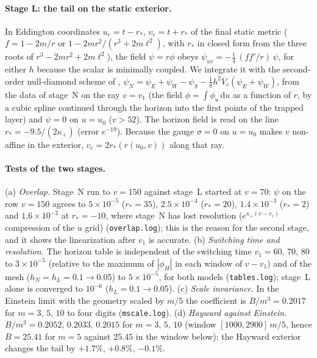 \documentclass[11pt]{article}
\begin{document}
\paragraph{Stage L: the tail on the static exterior.} In Eddington coordinates $u_e=t-r_*$, $v_e=t+r_*$ of the final static metric ($f=1-2m/r$ or $1-2mr^{2}/(r^{3}+2m\ell^{2})$, with $r_*$ in closed form from the three roots of $r^{3}-2mr^{2}+2m\ell^{2}$), the field $\psi=r\phi$ obeys $\psi_{uv}=-\tfrac14\,(ff'/r)\,\psi$, for either $h$ because the scalar is minimally coupled. We integrate it with the second-order null-diamond scheme of \citet{GundlachPricePullin1994}, $\psi_N=\psi_E+\psi_W-\psi_S-\tfrac18h^{2}V_c(\psi_E+\psi_W)$, from the data of stage~N on the ray $v=v_1$ (the field $\phi=\int\phi_u\,\mathrm du$ as a function of $r$, by a cubic spline continued through the horizon into the first points of the trapped layer) and $\psi=0$ on $u=u_0$ ($v>52$). The horizon field is read on the line $r_*=-9.5/(2\kappa_+)$ (error $e^{-19}$). Because the gauge $\sigma=0$ on $u=u_0$ makes $v$ non-affine in the exterior, $v_e=2r_*(r(u_0,v))$ along that ray.

\paragraph{Tests of the two stages.} (a) \emph{Overlap.} Stage~N run to $v=150$ against stage~L started at $v=70$: $\psi$ on the row $v=150$ agrees to $5\times10^{-5}$ ($r_*=35$), $2.5\times10^{-4}$ ($r_*=20$), $1.4\times10^{-3}$ ($r_*=2$) and $1.6\times10^{-2}$ at $r_*=-10$, where stage~N has lost resolution ($e^{\kappa_+(v-v_c)}$ compression of the $u$ grid) (\texttt{overlap.log}); this is the reason for the second stage, and it shows the linearization after $v_1$ is accurate. (b) \emph{Switching time and resolution.} The horizon table is independent of the switching time $v_1=60,\,70,\,80$ to $3\times10^{-5}$ (relative to the maximum of $|\phi_H|$ in each window of $v-v_1$) and of the mesh ($h_N=h_L=0.1\to0.05$) to $5\times10^{-5}$, for both models (\texttt{tables.log}); stage~L alone is converged to $10^{-6}$ ($h_L=0.1\to0.05$). (c) \emph{Scale invariance.} In the Einstein limit with the geometry scaled by $m/5$ the coefficient is $B/m^{3}=0.2017$ for $m=3,\,5,\,10$ to four digits (\texttt{mscale.log}). (d) \emph{Hayward against Einstein.} $B/m^{3}=0.2052,\,0.2033,\,0.2015$ for $m=3,\,5,\,10$ (window $[1000,2900]\,m/5$, hence $B=25.41$ for $m=5$ against $25.45$ in the window below): the Hayward exterior changes the tail by $+1.7\%$, $+0.8\%$, $-0.1\%$.
\end{document}
